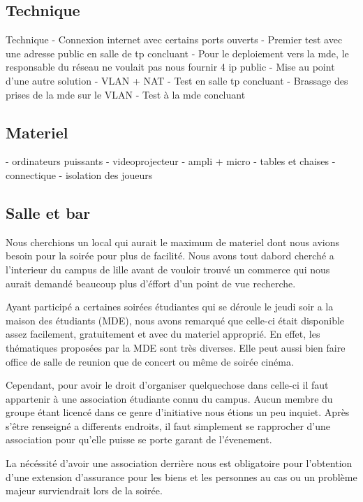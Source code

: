 \subsection{Technique}%
\label{sub:technique}

Technique
  - Connexion internet avec certains ports ouverts
  - Premier test avec une adresse public en salle de tp concluant
  - Pour le deploiement vers la mde, le responsable du réseau ne voulait pas nous fournir 4 ip public
  - Mise au point d'une autre solution
         - VLAN + NAT
  - Test en salle tp concluant
  - Brassage des prises de la mde sur le VLAN
  - Test à la mde concluant

\subsection{Materiel}%
\label{sub:materiel}

- ordinateurs puissants
- videoprojecteur
- ampli + micro
- tables et chaises
- connectique
- isolation des joueurs

\subsection{Salle et bar} %
\label{sub:salle_et_bar}

Nous cherchions un local qui aurait le maximum de materiel dont nous
avions besoin pour la soirée pour plus de facilité. Nous avons tout
dabord cherché a l'interieur du campus de lille avant de vouloir trouvé
un commerce qui nous aurait demandé beaucoup plus d'éffort d'un point de
vue recherche.

Ayant participé a certaines soirées étudiantes qui se déroule le jeudi
soir a la maison des étudiants (MDE), nous avons remarqué que celle-ci
était disponible assez facilement, gratuitement et avec du materiel
approprié. En effet, les thématiques proposées par la MDE sont très
diverses. Elle peut aussi bien faire office de salle de reunion que de
concert ou même de soirée cinéma.

Cependant, pour avoir le droit d'organiser quelquechose dans celle-ci il
faut appartenir à une association étudiante connu du campus. Aucun
membre du groupe étant licencé dans ce genre d'initiative nous étions un
peu inquiet. Après s'être renseigné a differents endroits, il faut
simplement se rapprocher d'une association pour qu'elle puisse se porte
garant de l'évenement.

La nécéssité d'avoir une association derrière nous est obligatoire pour
l'obtention d'une extension d'assurance pour les biens et les personnes
au cas ou un problème majeur surviendrait lors de la soirée.

